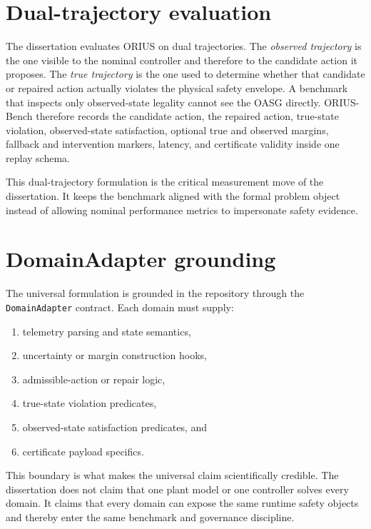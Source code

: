 \section{Dual-trajectory evaluation}
The dissertation evaluates ORIUS on dual trajectories. The \emph{observed trajectory} is the one
visible to the nominal controller and therefore to the candidate action it proposes. The
\emph{true trajectory} is the one used to determine whether that candidate or repaired action
actually violates the physical safety envelope. A benchmark that inspects only observed-state
legality cannot see the OASG directly. ORIUS-Bench therefore records the candidate action, the
repaired action, true-state violation, observed-state satisfaction, optional true and observed
margins, fallback and intervention markers, latency, and certificate validity inside one replay
schema.

This dual-trajectory formulation is the critical measurement move of the dissertation. It keeps
the benchmark aligned with the formal problem object instead of allowing nominal performance
metrics to impersonate safety evidence.

\section{DomainAdapter grounding}
The universal formulation is grounded in the repository through the \texttt{DomainAdapter}
contract. Each domain must supply:
\begin{enumerate}
  \item telemetry parsing and state semantics,
  \item uncertainty or margin construction hooks,
  \item admissible-action or repair logic,
  \item true-state violation predicates,
  \item observed-state satisfaction predicates, and
  \item certificate payload specifics.
\end{enumerate}
This boundary is what makes the universal claim scientifically credible. The dissertation does
not claim that one plant model or one controller solves every domain. It claims that every domain
can expose the same runtime safety objects and thereby enter the same benchmark and governance
discipline.

